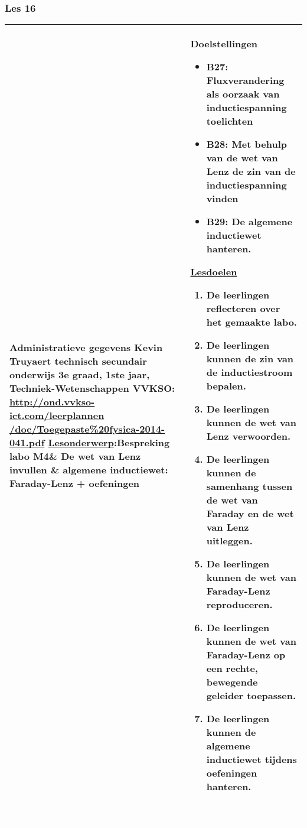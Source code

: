 


\begin{landscape}
	\subsubsection{Les 16}
	\begin{tabularx}{1.56\textwidth}{|p{}|X|}\hline
		\textbf{Administratieve gegevens}\newline\newline
		Kevin Truyaert\newline\newline
		technisch secundair onderwijs\newline
		3e graad, 1ste jaar, Techniek-Wetenschappen\newline
		VVKSO: \href{http://ond.vvkso-ict.com/leerplannen/doc/Toegepaste\%20fysica-2014-041.pdf}{http://ond.vvkso-ict.com/leerplannen /doc/Toegepaste\%20fysica-2014-041.pdf} \newline
		\underline{Lesonderwerp}:\newline Bespreking labo M4\& De wet van Lenz invullen \& algemene inductiewet: Faraday-Lenz + oefeningen & \textbf{Doelstellingen}
		\begin{itemize}[itemsep=0.08\baselineskip]
			\item B27: Fluxverandering als oorzaak van inductiespanning toelichten
			\item B28: Met behulp van de wet van Lenz de zin van de inductiespanning vinden
			\item B29: De algemene inductiewet hanteren.
		\end{itemize}
		\underline{Lesdoelen}\newline
		\vspace{-0.75cm}
		\begin{enumerate}[itemsep=0.08\baselineskip]
			\item De leerlingen reflecteren over het gemaakte labo.
			\item De leerlingen kunnen de zin van de inductiestroom bepalen.
			\item De leerlingen kunnen de wet van Lenz verwoorden.
			\item De leerlingen kunnen de samenhang tussen de wet van Faraday en de wet van Lenz uitleggen.
			\item De leerlingen kunnen de wet van Faraday-Lenz reproduceren.
			\item De leerlingen kunnen de wet van Faraday-Lenz op een rechte, bewegende geleider toepassen.
			\item De leerlingen kunnen de algemene inductiewet tijdens oefeningen hanteren.
		\end{enumerate} \\\hline
	\end{tabularx}\vfill \textcolor{white}{.} 



\end{landscape}
